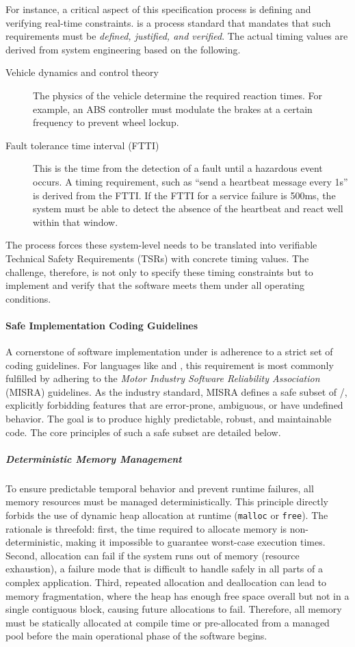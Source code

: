 For instance, a critical aspect of this specification process is defining and verifying real-time
constraints. \iso is a process standard that mandates that such requirements must be \emph{defined,
    justified, and verified}. The actual timing values are derived from system engineering based on
the following.
\begin{description}
    \item[Vehicle dynamics and control theory] The physics of the vehicle
          determine the required reaction times. For example, an ABS controller must
          modulate the brakes at a certain frequency to prevent wheel lockup.
    \item[Fault tolerance time interval (FTTI)] This is the time from the
          detection of a fault until a hazardous event occurs. A timing requirement,
          such as ``send a heartbeat message every 1s'' is derived from the FTTI. If the
          FTTI for a service failure is 500ms, the system must be able to detect the
          absence of the heartbeat and react well within that window.
\end{description}
The \iso process forces these system-level needs to be translated into verifiable
Technical Safety Requirements (TSRs) with concrete timing values. The challenge,
therefore, is not only to specify these timing constraints but to implement and verify
that the software meets them under all operating conditions.

\paragraph{Safe Implementation \via Coding Guidelines}
A cornerstone of software implementation under \iso is adherence to a strict set of
coding guidelines. For languages like \Ci and \Cpp, this requirement is most commonly
fulfilled by adhering to the \emph{Motor Industry Software Reliability Association}
(MISRA) guidelines. As the  industry standard, MISRA defines a safe subset of
\Ci/\Cpp, explicitly forbidding features that are error-prone, ambiguous, or have undefined
behavior. The goal is to produce highly predictable, robust, and maintainable code. The
core principles of such a safe subset are detailed below.

\subparagraph{Deterministic Memory Management}
To ensure predictable temporal behavior and prevent runtime failures, all memory resources
must be managed deterministically. This principle directly forbids the use of dynamic
heap allocation at runtime (\eg \via \texttt{malloc} or \texttt{free}). The rationale is
threefold: first, the time required to allocate memory is non-deterministic, making it
impossible to guarantee worst-case execution times. Second, allocation can fail if the
system runs out of memory (resource exhaustion), a failure mode that is difficult to
handle safely in all parts of a complex application. Third, repeated allocation and
deallocation can lead to memory fragmentation, where the heap has enough free space
overall but not in a single contiguous block, causing future allocations to fail.
Therefore, all memory must be statically allocated at compile time or pre-allocated from
a managed pool before the main operational phase of the software begins.


